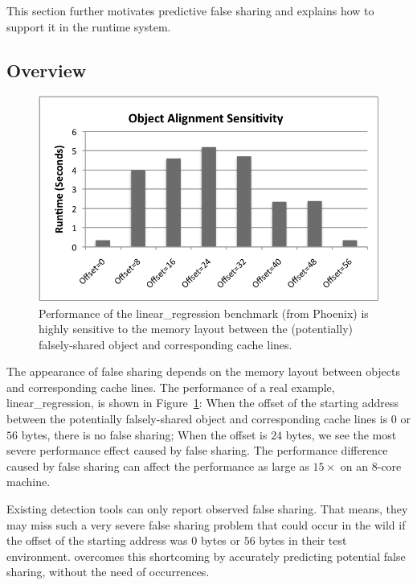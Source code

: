\label{sec:prediction}
This section further motivates predictive false sharing and explains how to support it in the runtime system.  

\subsection{Overview}
\label{sec:predictoverview}

\begin{figure}[!t]
\begin{center}
\includegraphics[width=5in]{predator/figure/perfsensitive}
\end{center}
\caption{
Performance of the linear\_regression benchmark (from Phoenix)  is highly sensitive to the memory layout between the (potentially) falsely-shared object and corresponding cache lines. 
\label{fig:perfsensitive}}
\end{figure}

The appearance of false sharing depends on 
the memory layout between objects and corresponding cache lines. The performance of a real example, linear\_regression, is shown in Figure~\ref{fig:perfsensitive}: 
When the offset of the starting address between the potentially falsely-shared object and corresponding cache lines is $0$ or $56$ bytes, there is no false sharing; 
When the offset is $24$ bytes, we see the most severe performance effect caused by false sharing. 
The performance difference caused by false sharing can affect the performance as large as $15\times$ on an 8-core machine. 

Existing detection tools can only report observed false sharing. That means, they may miss such a very severe false sharing problem that could occur in the wild if the offset of the starting address was $0$ bytes or $56$ bytes in their test environment. \Predator{} overcomes this shortcoming by accurately predicting potential false sharing, without the need of occurrences. 

